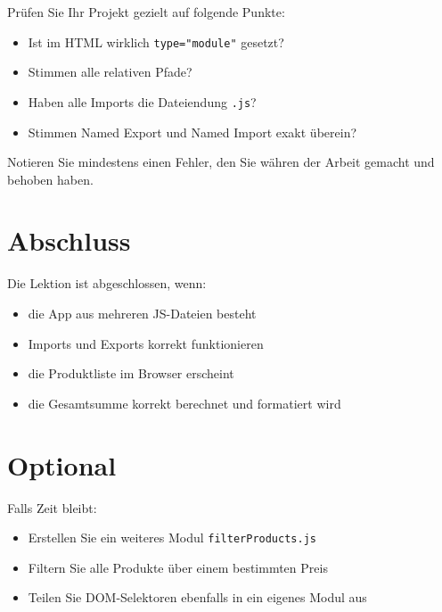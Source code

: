 \documentclass[a4paper,12pt]{article}
\begin{document}
Prüfen Sie Ihr Projekt gezielt auf folgende Punkte:
\begin{itemize}
    \item Ist im HTML wirklich \texttt{type="module"} gesetzt?
    \item Stimmen alle relativen Pfade?
    \item Haben alle Imports die Dateiendung \texttt{.js}?
    \item Stimmen Named Export und Named Import exakt überein?
\end{itemize}

Notieren Sie mindestens einen Fehler, den Sie währen der Arbeit gemacht und behoben haben.

\section{Abschluss}

Die Lektion ist abgeschlossen, wenn:
\begin{itemize}
    \item die App aus mehreren JS-Dateien besteht
    \item Imports und Exports korrekt funktionieren
    \item die Produktliste im Browser erscheint
    \item die Gesamtsumme korrekt berechnet und formatiert wird
\end{itemize}

\section{Optional}

Falls Zeit bleibt:
\begin{itemize}
    \item Erstellen Sie ein weiteres Modul \texttt{filterProducts.js}
    \item Filtern Sie alle Produkte über einem bestimmten Preis
    \item Teilen Sie DOM-Selektoren ebenfalls in ein eigenes Modul aus
\end{itemize}
\end{document}
